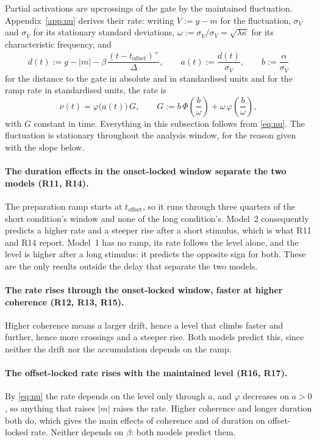\documentclass[a4paper,11pt]{article}
\newcommand{\1}{\mathbbm{1}}
\newcommand{\toff}{t_{\mathrm{offset}}}
\begin{document}
Partial activations are upcrossings of the gate by the maintained fluctuation.
Appendix~\ref{app:nu} derives their rate: writing $V:=y-m$ for the fluctuation, $\sigma_V$
and $\sigma_{\dot V}$ for its stationary standard deviations,
$\omega:=\sigma_{\dot V}/\sigma_V=\sqrt{\lambda\kappa}$ for its characteristic frequency,
and
\begin{equation}
d(t):=g-|m|-\beta\,\frac{(t-\toff)^{+}}{\Delta},
\qquad
a(t):=\frac{d(t)}{\sigma_V},
\qquad
b:=\frac{\alpha}{\sigma_V}
\end{equation}
for the distance to the gate in absolute and in standardised units and for the ramp rate
in standardised units, the rate is
\begin{equation}
\nu(t)=\varphi\bigl(a(t)\bigr)\,G,
\qquad
G:=b\,\Phi\!\left(\frac{b}{\omega}\right)+\omega\,\varphi\!\left(\frac{b}{\omega}\right),
\label{eq:nu}
\end{equation}
with $G$ constant in time. Everything in this subsection follows from
\eqref{eq:nu}. The fluctuation is stationary throughout the analysis window, for the
reason given with the slope below.

\paragraph{The duration effects in the onset-locked window separate the two models
(R11, R14).} The preparation ramp starts at $\toff$, so it runs through three quarters of
the short condition's window and none of the long condition's. Model~2 consequently predicts a higher rate and a steeper
rise after a short stimulus, which is what R11 and R14 report. Model~1 has no ramp, its
rate follows the level alone, and the level is higher after a long stimulus: it predicts
the opposite sign for both. These are the only results outside the delay that separate the
two models.

\paragraph{The rate rises through the onset-locked window, faster at higher coherence
(R12, R13, R15).} Higher coherence means a larger drift, hence a level that climbs faster
and further, hence more crossings and a steeper rise. Both models predict this, since
neither the drift nor the accumulation depends on the ramp.

\paragraph{The offset-locked rate rises with the maintained level (R16, R17).} By \eqref{eq:nu} the rate
depends on the level only through $a$, and $\varphi$ decreases on $a>0$, so anything that
raises $|m|$ raises the rate. Higher coherence and longer duration both do, which gives
the main effects of coherence and of duration on offset-locked rate. Neither depends on
$\beta$: both models predict them.
\end{document}
